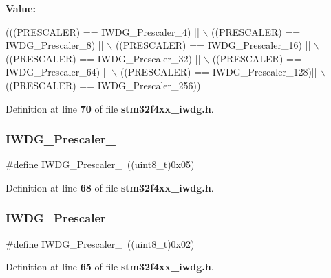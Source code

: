 {\bfseries Value\+:}
\begin{DoxyCode}
(((PRESCALER) == IWDG_Prescaler_4)  || \(\backslash\)
                                      ((PRESCALER) == IWDG_Prescaler_8)  || \(\backslash\)
                                      ((PRESCALER) == IWDG_Prescaler_16) || \(\backslash\)
                                      ((PRESCALER) == IWDG_Prescaler_32) || \(\backslash\)
                                      ((PRESCALER) == IWDG_Prescaler_64) || \(\backslash\)
                                      ((PRESCALER) == IWDG_Prescaler_128)|| \(\backslash\)
                                      ((PRESCALER) == IWDG_Prescaler_256))
\end{DoxyCode}


Definition at line \textbf{ 70} of file \textbf{ stm32f4xx\+\_\+iwdg.\+h}.

\mbox{\label{group__IWDG__prescaler_gaea6bf96c2fd5a6f3b9574e7898096641}} 
\subsubsection{I\+W\+D\+G\+\_\+\+Prescaler\+\_}
{\footnotesize\ttfamily \#define I\+W\+D\+G\+\_\+\+Prescaler\+\_~((uint8\+\_\+t)0x05)}



Definition at line \textbf{ 68} of file \textbf{ stm32f4xx\+\_\+iwdg.\+h}.

\mbox{\label{group__IWDG__prescaler_gafa81d30511ff5ec74bb38ed71f5bb66e}} 
\subsubsection{I\+W\+D\+G\+\_\+\+Prescaler\+\_}
{\footnotesize\ttfamily \#define I\+W\+D\+G\+\_\+\+Prescaler\+\_~((uint8\+\_\+t)0x02)}



Definition at line \textbf{ 65} of file \textbf{ stm32f4xx\+\_\+iwdg.\+h}.

\mbox{\label{group__IWDG__prescaler_ga7d6e918748185639049644c970db2b43}} 
